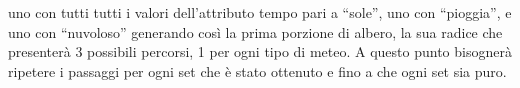	



uno con tutti tutti i valori dell'attributo tempo pari a ``sole'', uno con ``pioggia'', e uno con ``nuvoloso'' generando così la prima porzione di albero, la sua radice che presenterà 3 possibili percorsi, 1 per ogni tipo di meteo. A questo punto bisognerà ripetere i passaggi per ogni set che è stato ottenuto e fino a che ogni set sia puro.


